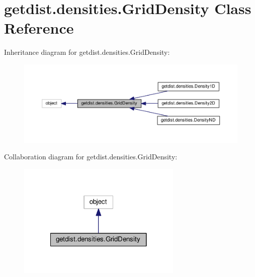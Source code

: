 \hypertarget{classgetdist_1_1densities_1_1GridDensity}{}\section{getdist.\+densities.\+Grid\+Density Class Reference}
\label{classgetdist_1_1densities_1_1GridDensity}


Inheritance diagram for getdist.\+densities.\+Grid\+Density\+:
\nopagebreak
\begin{figure}[H]
\begin{center}
\leavevmode
\includegraphics[width=350pt]{classgetdist_1_1densities_1_1GridDensity__inherit__graph}
\end{center}
\end{figure}


Collaboration diagram for getdist.\+densities.\+Grid\+Density\+:
\nopagebreak
\begin{figure}[H]
\begin{center}
\leavevmode
\includegraphics[width=222pt]{classgetdist_1_1densities_1_1GridDensity__coll__graph}
\end{center}
\end{figure}
